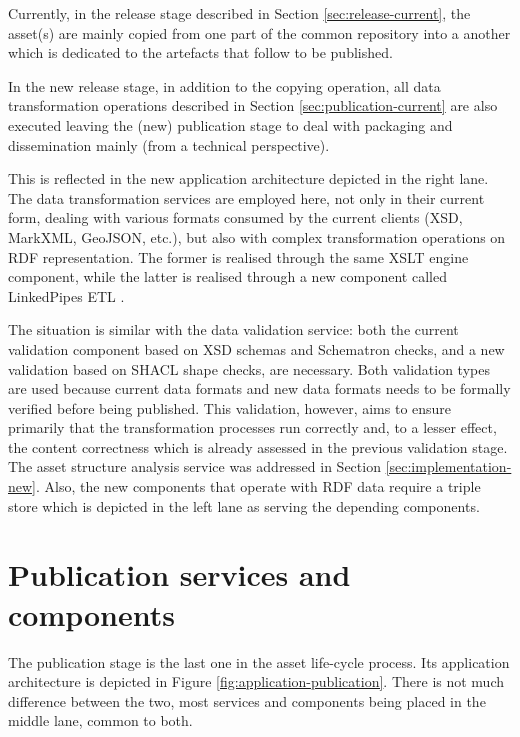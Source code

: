 	Currently, in the release stage described in Section \ref{sec:release-current}, the asset(s) are mainly copied from one part of the common repository into a another which is dedicated to the artefacts that follow to be published. 
	
	In the new release stage, in addition to the copying operation, all data transformation operations described in Section \ref{sec:publication-current} are also executed leaving the (new) publication stage to deal with packaging and dissemination mainly (from a technical perspective).
	
	This is reflected in the new application architecture depicted in the right lane. The data transformation services are employed here, not only in their current form, dealing with various formats consumed by the current clients (XSD, MarkXML, GeoJSON, etc.), but also with complex transformation operations on RDF representation. The former is realised through the same XSLT engine component, while the latter is realised through a new component called LinkedPipes ETL \citep{linkedpipes-klimek2016linkedpipes,linkedpipes-klimek2017linkedpipes}.
	
	The situation is similar with the data validation service: both the current validation component based on XSD schemas and Schematron checks, and a new validation based on SHACL shape checks, are necessary. Both validation types are used because current data formats and new data formats needs to be formally verified before being published. This validation, however, aims to ensure primarily that the transformation processes run correctly and, to a lesser effect, the content correctness which is already assessed in the previous validation stage. The asset structure analysis service was addressed in Section \ref{sec:implementation-new}. Also, the new components that operate with RDF data require a triple store which is depicted in the left lane as serving the depending components.
	
	
	\section{Publication services and components}
	\label{sec:publication-application}	
	
	The publication stage is the last one in the asset life-cycle process. Its application architecture is depicted in Figure \ref{fig:application-publication}. There is not much difference between the two, most services and components being placed in the middle lane, common to both. 
	

